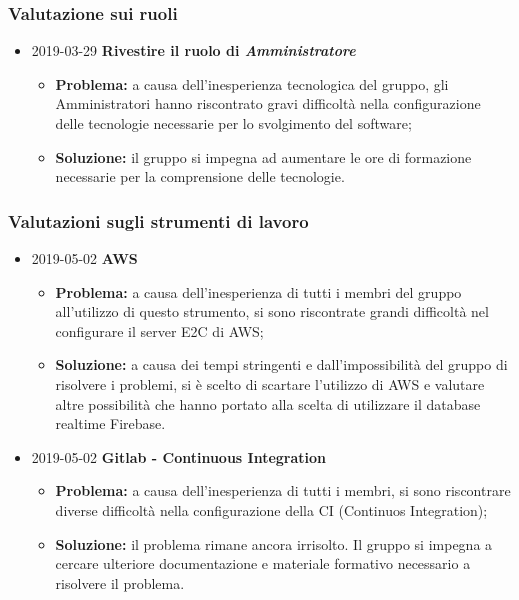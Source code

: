\subsubsection{Valutazione sui ruoli}

\begin{itemize}
\item 2019-03-29 \textbf{Rivestire il ruolo di \textit{Amministratore}} \\
		\begin{itemize}
			\item \textbf{Problema:} a causa dell'inesperienza tecnologica del gruppo, gli Amministratori hanno riscontrato gravi difficoltà nella configurazione delle tecnologie necessarie per lo svolgimento del software;
			\item \textbf{Soluzione:} il gruppo si impegna ad aumentare le ore di formazione necessarie per la comprensione delle tecnologie.
		\end{itemize}	
		
		
\end{itemize}
\subsubsection{Valutazioni sugli strumenti di lavoro}
\begin{itemize}
				
		\item 2019-05-02 \textbf{AWS} \\
		\begin{itemize}
			\item \textbf{Problema:} a causa dell'inesperienza di tutti i membri del gruppo all'utilizzo di questo strumento, si sono riscontrate grandi difficoltà nel configurare il server E2C di AWS;
			\item \textbf{Soluzione:} a causa dei tempi stringenti e dall'impossibilità del gruppo di risolvere i problemi, si è scelto di scartare l'utilizzo di AWS e valutare altre possibilità che hanno portato alla scelta di utilizzare il database realtime Firebase.
		\end{itemize}		
		\item 2019-05-02 \textbf{Gitlab - Continuous Integration} \\
		\begin{itemize}
			\item \textbf{Problema:} a causa dell'inesperienza di tutti i membri, si sono riscontrare diverse difficoltà nella configurazione della CI (Continuos Integration\glo);
			\item \textbf{Soluzione:} il problema rimane ancora irrisolto. Il gruppo si impegna a cercare ulteriore documentazione e materiale formativo necessario a risolvere il problema.
		\end{itemize}
\end{itemize}

